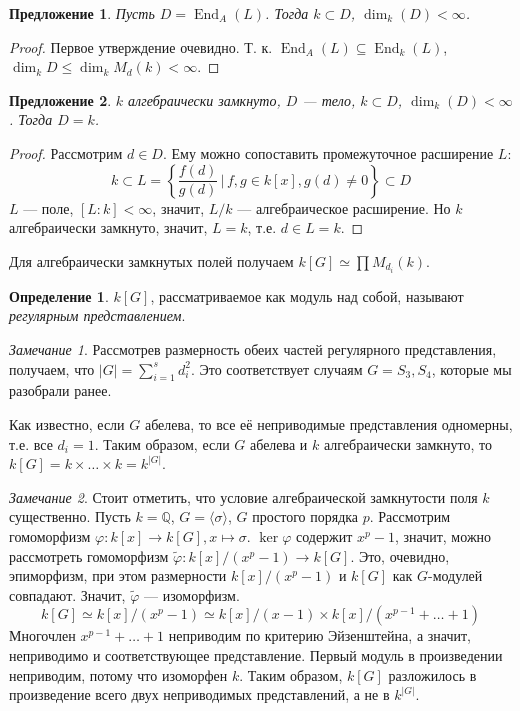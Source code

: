 \documentclass{article}
\newtheorem*{proposition}{Предложение}
\theoremstyle{definition}
\newtheorem*{definition}{Определение}
\theoremstyle{remark}
\newtheorem*{remark}{Замечание}
\DeclareMathOperator{\End}{End}
\newcommand{\Q}{\mathbb{Q}}
\begin{document}
\begin{proposition}
    Пусть $D = \End_A(L)$. Тогда $k \subset D$, $\dim_k(D) < \infty$. 
\end{proposition}
\begin{proof}
	Первое утверждение очевидно. Т. к. $\End_A(L) \subseteq \End_k(L)$, $\dim_k D \le \dim_k M_d(k) < \infty$.
\end{proof}

\begin{proposition}
    $k$ алгебраически замкнуто, $D$ --- тело, $k \subset D$, $\dim_k(D) < \infty$. Тогда $D = k$.
\end{proposition}
\begin{proof}
    Рассмотрим $d \in D$. Ему можно сопоставить промежуточное расширение $L$:
    \begin{equation*}
        k \subset L = \left\{ \frac{f(d)}{g(d)} \,|\, f,g \in k[x], g(d) \neq 0 \right\} \subset D
    \end{equation*}
    $L$ --- поле, $[L : k] < \infty$, значит, $L/k$ --- алгебраическое расширение. Но $k$ алгебраически замкнуто, значит, $L = k$, т.е. $d \in L = k$.
\end{proof}

Для алгебраически замкнутых полей получаем $k[G] \simeq \prod M_{d_i}(k)$.

\begin{definition}
	$k[G]$, рассматриваемое как модуль над собой, называют \textit{регулярным представлением}.
\end{definition}

\begin{remark}
    Рассмотрев размерность обеих частей регулярного представления, получаем, что $|G| = \sum_{i=1}^s d_i^2$. Это соответствует случаям $G = S_3, S_4$, которые мы разобрали ранее.

    Как известно, если $G$ абелева, то все её неприводимые представления одномерны, т.е. все $d_i = 1$. Таким образом, если $G$ абелева и $k$ алгебраически замкнуто, то $k[G] = k \times \hdots \times k = k^{|G|}$.
\end{remark}

\begin{remark}
    Стоит отметить, что условие алгебраической замкнутости поля $k$ существенно. Пусть $k = \Q$, $G = \langle \sigma \rangle$, $G$ простого порядка $p$. Рассмотрим гомоморфизм $\varphi: k[x] \to k[G], x \mapsto \sigma$. $\ker \varphi$ содержит $x^p - 1$, значит, можно рассмотреть гомоморфизм $\tilde{\varphi}: k[x]/(x^p - 1) \to k[G]$. Это, очевидно, эпиморфизм, при этом размерности $k[x]/(x^p - 1)$ и $k[G]$ как $G$-модулей совпадают. Значит, $\tilde{\varphi}$ --- изоморфизм.
    \begin{equation*}
        k[G] \simeq k[x]/(x^p - 1) \simeq k[x]/(x - 1) \times k[x]/(x^{p-1} + \hdots + 1)
    \end{equation*}
    Многочлен $x^{p-1} + \hdots + 1$ неприводим по критерию Эйзенштейна, а значит, неприводимо и соответствующее представление. Первый модуль в произведении неприводим, потому что изоморфен $k$. Таким образом, $k[G]$ разложилось в произведение всего двух неприводимых представлений, а не в $k^{|G|}$.
\end{remark}
\end{document}

